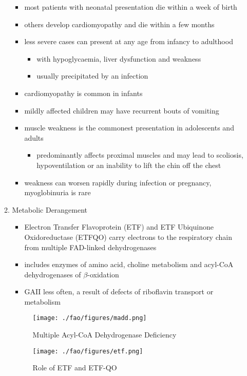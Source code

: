 \documentclass{scrartcl}
\begin{document}
\begin{enumerate}
\begin{enumerate}
\begin{itemize}
\item most patients with neonatal presentation die within a week of birth
\item others develop cardiomyopathy and die within a few months
\item less severe cases can present at any age from infancy to adulthood
\begin{itemize}
\item with hypoglycaemia, liver dysfunction and weakness
\item usually precipitated by an infection
\end{itemize}
\item cardiomyopathy is common in infants
\item mildly affected children may have recurrent bouts of vomiting
\item muscle weakness is the commonest presentation in adolescents and adults
\begin{itemize}
\item predominantly affects proximal muscles and may lead to scoliosis,
hypoventilation or an inability to lift the chin off the chest
\end{itemize}
\item weakness can worsen rapidly during infection or pregnancy, myoglobinuria is rare
\end{itemize}

\item Metabolic Derangement
\label{sec:orga58370f}
\begin{itemize}
\item Electron Transfer Flavoprotein (ETF) and ETF Ubiquinone
Oxidoreductase (ETFQO) carry electrons to the respiratory chain from
multiple FAD-linked dehydrogenases
\item includes enzymes of amino acid, choline metabolism and acyl-CoA
dehydrogenases of \(\beta\)-oxidation
\item GAII less often, a result of defects of riboflavin transport or
metabolism
\end{itemize}

\begin{figure}[htbp]
\centering
\texttt{[image: ./fao/figures/madd.png]}
\caption{\label{fig:orga012a34}
Multiple Acyl-CoA Dehydrogenase Deficiency}
\end{figure}

\begin{figure}[htbp]
\centering
\texttt{[image: ./fao/figures/etf.png]}
\caption{\label{fig:org2d0c008}
Role of ETF and ETF-QO}
\end{figure}


\end{enumerate}
\end{enumerate}
\end{document}
